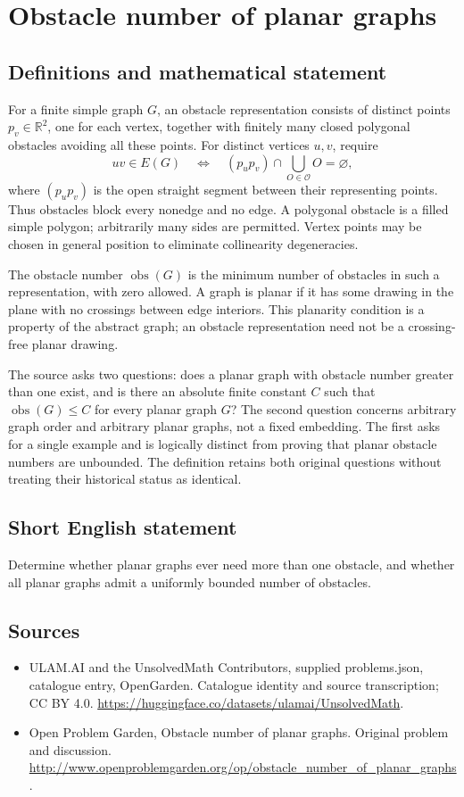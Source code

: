 \documentclass[11pt,a4paper]{article}
\begin{document}
\section*{Obstacle number of planar graphs}\label{statement}

\subsection{Definitions and mathematical statement}
For a finite simple graph $G$, an obstacle representation consists of distinct points $p_v\in\mathbb R^2$, one for each vertex, together with finitely many closed polygonal obstacles avoiding all these points. For distinct vertices $u,v$, require
\[
 uv\in E(G)\quad\Longleftrightarrow\quad
 (p_up_v)\cap\bigcup_{O\in\mathcal O}O=\varnothing,
\]
where $(p_up_v)$ is the open straight segment between their representing points. Thus obstacles block every nonedge and no edge. A polygonal obstacle is a filled simple polygon; arbitrarily many sides are permitted. Vertex points may be chosen in general position to eliminate collinearity degeneracies.

The obstacle number $\operatorname{obs}(G)$ is the minimum number of obstacles in such a representation, with zero allowed. A graph is planar if it has some drawing in the plane with no crossings between edge interiors. This planarity condition is a property of the abstract graph; an obstacle representation need not be a crossing-free planar drawing.

The source asks two questions: does a planar graph with obstacle number greater than one exist, and is there an absolute finite constant $C$ such that $\operatorname{obs}(G)\le C$ for every planar graph $G$? The second question concerns arbitrary graph order and arbitrary planar graphs, not a fixed embedding. The first asks for a single example and is logically distinct from proving that planar obstacle numbers are unbounded. The definition retains both original questions without treating their historical status as identical.
\subsection{Short English statement}
Determine whether planar graphs ever need more than one obstacle, and whether all planar graphs admit a uniformly bounded number of obstacles.
\subsection{Sources}
\begin{itemize}
\item[S1] ULAM.AI and the UnsolvedMath Contributors, supplied problems.json, catalogue entry, OpenGarden. Catalogue identity and source transcription; CC BY 4.0.
\url{https://huggingface.co/datasets/ulamai/UnsolvedMath}.
\item[S2] Open Problem Garden, Obstacle number of planar graphs. Original problem and discussion.
\url{http://www.openproblemgarden.org/op/obstacle_number_of_planar_graphs}.
\end{itemize}
\end{document}
